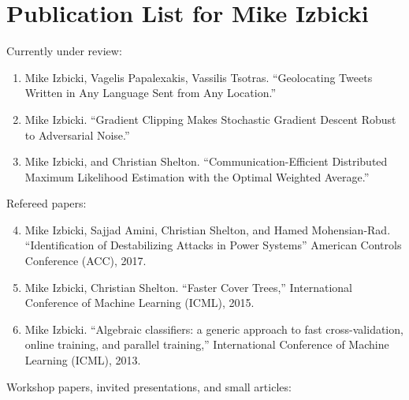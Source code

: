 \documentclass[12pt]{article}
\begin{document}
\section*{Publication List for Mike Izbicki}

\noindent
Currently under review:
\begin{enumerate}
\item
Mike Izbicki, Vagelis Papalexakis, Vassilis Tsotras.
``Geolocating Tweets Written in Any Language Sent from Any Location.''

\item
Mike Izbicki.
``Gradient Clipping Makes Stochastic Gradient Descent Robust to Adversarial Noise.''

\item
Mike Izbicki, and Christian Shelton.
``Communication-Efficient Distributed Maximum Likelihood Estimation with the Optimal Weighted Average.''

\end{enumerate}

\noindent
Refereed papers:

\begin{enumerate}
\setcounter{enumi}{3}
\item
Mike Izbicki, Sajjad Amini, Christian Shelton, and Hamed Mohensian-Rad.
``Identification of Destabilizing Attacks in Power Systems''
American Controls Conference (ACC),
2017.

\item
Mike Izbicki, Christian Shelton.
``Faster Cover Trees,''
International Conference of Machine Learning (ICML),
2015.

\item
Mike Izbicki.
``Algebraic classifiers: a generic approach to fast cross-validation, online training, and parallel training,''
International Conference of Machine Learning (ICML),
2013.
\end{enumerate}

\noindent
Workshop papers, invited presentations, and small articles:
\end{document}
